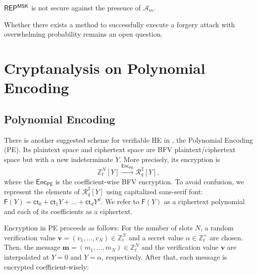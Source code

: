 \documentclass[runningheads]{llncs}
\newcommand{\bb}[1]{\mathbb{#1}}  %
\newcommand{\cc}[1]{\mathcal{#1}} %
\newcommand{\ct}{\textsf{ct}{}}
\newcommand{\PE}{\textsf{PE}{}}
\newcommand{\enc}{\textsf{Enc}}
\begin{document}
        \begin{corollary}
            $\sf REP^{\sf MSK}$ is not secure against the presence of $\cc A_m.$
        \end{corollary} 
        Whether there exists a method to successfully execute a forgery attack with overwhelming probability remains an open question.
         

\section{Cryptanalysis on Polynomial Encoding} \label{sec:PE}

    \subsection{Polynomial Encoding}
    There is another suggested scheme for verifiable HE in \cite{VE}, the Polynomial Encoding (\PE).
    Its plaintext space and ciphertext space are BFV plaintext/ciphertext space but with a new indeterminate $Y$. 
    More precisely, its encryption is 
        \[
            \bb{Z}^N_t[Y] \overset{\enc_\PE}{\longrightarrow} \mathcal{R}^2_q[Y],
        \]
    where the $\enc_\PE$ is the coefficient-wise BFV encryption.
    To avoid confusion, we represent the elements of $\mathcal{R}^2_q[Y]$ using capitalized sans-serif font: $\mathsf{F}(Y) = \ct_0 + \ct_1 Y + \dots + \ct_d Y^d$. 
    We refer to $\mathsf{F}(Y)$ as a ciphertext polynomial and each of its coefficients as a ciphertext.

    Encryption in \PE{} proceeds as follows: 
    For the number of slots $N$, a random verification value $\mathbf{v}=(v_1,\dots, v_N)\in \bb Z_t^N$ and a secret value $\alpha \in \mathbb{Z}_t^\times$ are chosen. 
    Then, the message $\mathbf{m}=(m_1,\dots,m_N)\in \bb Z_t^N$ and the verification value $\mathbf{v}$ are interpolated at $Y = 0$ and $Y = \alpha$, respectively. 
    After that, each message is encrypted coefficient-wisely:
    
\end{document}
